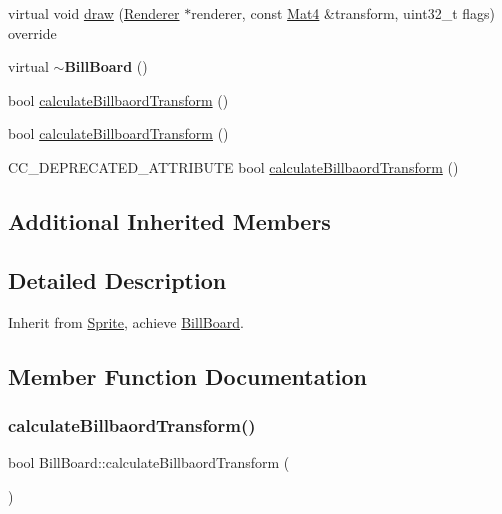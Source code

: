 \begin{DoxyCompactItemize}
\item 
virtual void \hyperlink{classBillBoard_a61816c66a9b5dbfbe12cf1bd747f5229}{draw} (\hyperlink{classRenderer}{Renderer} $\ast$renderer, const \hyperlink{classMat4}{Mat4} \&transform, uint32\+\_\+t flags) override
\item 
\mbox{\label{classBillBoard_aa4c5e02770b192c2ce38558ae687c565}} 
virtual {\bfseries $\sim$\+Bill\+Board} ()
\item 
bool \hyperlink{classBillBoard_a496fc1c16f4fa8c2ac82f7112e89d47c}{calculate\+Billbaord\+Transform} ()
\item 
bool \hyperlink{classBillBoard_ad38011949e599e214f162a245b929c9c}{calculate\+Billboard\+Transform} ()
\item 
C\+C\+\_\+\+D\+E\+P\+R\+E\+C\+A\+T\+E\+D\+\_\+\+A\+T\+T\+R\+I\+B\+U\+TE bool \hyperlink{classBillBoard_a8ae4248e8b3700d1c40fbc7b212ca95d}{calculate\+Billbaord\+Transform} ()
\end{DoxyCompactItemize}
\subsection*{Additional Inherited Members}


\subsection{Detailed Description}
Inherit from \hyperlink{classSprite}{Sprite}, achieve \hyperlink{classBillBoard}{Bill\+Board}. 

\subsection{Member Function Documentation}
\mbox{\label{classBillBoard_a496fc1c16f4fa8c2ac82f7112e89d47c}} 
\subsubsection{\texorpdfstring{calculate\+Billbaord\+Transform()}{calculateBillbaordTransform()}\hspace{0.1cm}{\footnotesize\ttfamily [1/2]}}
{\footnotesize\ttfamily bool Bill\+Board\+::calculate\+Billbaord\+Transform (\begin{DoxyParamCaption}{ }\end{DoxyParamCaption})\hspace{0.3cm}{\ttfamily [protected]}}

